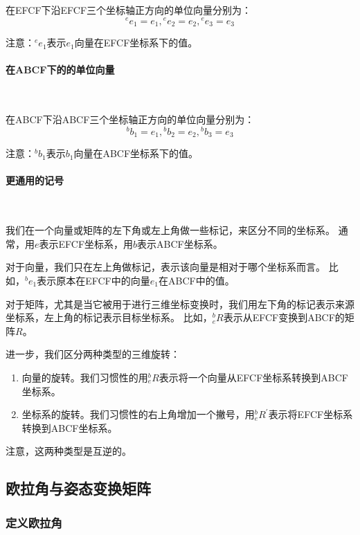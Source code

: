 \documentclass{article} %
\numberwithin{equation}{section} %
\begin{document}
在EFCF下沿EFCF三个坐标轴正方向的单位向量分别为：
\begin{equation}
{}^{e}e_1=e_1, {}^{e}e_2=e_2, {}^{e}e_3=e_3
\end{equation}

注意：${}^{e}e_1$表示$e_1$向量在EFCF坐标系下的值。

\paragraph{在ABCF下的的单位向量}~

在ABCF下沿ABCF三个坐标轴正方向的单位向量分别为：
\begin{equation}
{}^{b}b_1=e_1, {}^{b}b_2=e_2, {}^{b}b_3=e_3
\end{equation}

注意：${}^{b}b_1$表示$b_1$向量在ABCF坐标系下的值。

\paragraph{更通用的记号}~

我们在一个向量或矩阵的左下角或左上角做一些标记，来区分不同的坐标系。
通常，用$e$表示EFCF坐标系，用$b$表示ABCF坐标系。

对于向量，我们只在左上角做标记，表示该向量是相对于哪个坐标系而言。
比如，${}^{b}e_1$表示原本在EFCF中的向量$e_1$在ABCF中的值。

对于矩阵，尤其是当它被用于进行三维坐标变换时，我们用左下角的标记表示来源坐标系，左上角的标记表示目标坐标系。
比如，${}_{e}^{b}R$表示从EFCF变换到ABCF的矩阵$R$。

进一步，我们区分两种类型的三维旋转：
\begin{enumerate}
\item 向量的旋转。我们习惯性的用${}_{e}^{b}R$表示将一个向量从EFCF坐标系转换到ABCF坐标系。
\item 坐标系的旋转。我们习惯性的右上角增加一个撇号，用${}_{e}^{b}R^{'}$表示将EFCF坐标系转换到ABCF坐标系。
\end{enumerate}
注意，这两种类型是互逆的。

\subsection{欧拉角与姿态变换矩阵}

\subsubsection{定义欧拉角}
\end{document}

